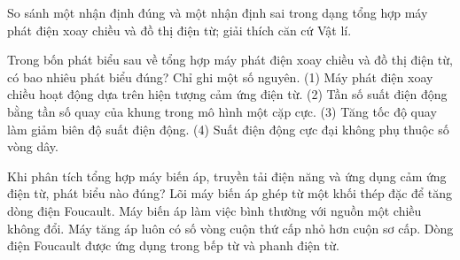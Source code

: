 \begin{bt}
So sánh một nhận định đúng và một nhận định sai trong dạng tổng hợp máy phát điện xoay chiều và đồ thị điện từ; giải thích căn cứ Vật lí.
\end{bt}

\begin{ex}
Trong bốn phát biểu sau về tổng hợp máy phát điện xoay chiều và đồ thị điện từ, có bao nhiêu phát biểu đúng? Chỉ ghi một số nguyên. (1) Máy phát điện xoay chiều hoạt động dựa trên hiện tượng cảm ứng điện từ. (2) Tần số suất điện động bằng tần số quay của khung trong mô hình một cặp cực. (3) Tăng tốc độ quay làm giảm biên độ suất điện động. (4) Suất điện động cực đại không phụ thuộc số vòng dây.
\end{ex}

\begin{ex}
Khi phân tích tổng hợp máy biến áp, truyền tải điện năng và ứng dụng cảm ứng điện từ, phát biểu nào đúng?
\choice
{Lõi máy biến áp ghép từ một khối thép đặc để tăng dòng điện Foucault.}
{Máy biến áp làm việc bình thường với nguồn một chiều không đổi.}
{Máy tăng áp luôn có số vòng cuộn thứ cấp nhỏ hơn cuộn sơ cấp.}
{\True Dòng điện Foucault được ứng dụng trong bếp từ và phanh điện từ.}
\end{ex}

